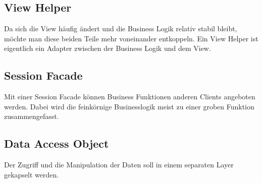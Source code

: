 \subsection{View Helper}

Da sich die View häufig ändert und die Business Logik relativ stabil bleibt, möchte man diese beiden Teile mehr voneinander entkoppeln. Ein View Helper ist eigentlich ein Adapter zwischen der Business Logik und dem View.

\subsection{Session Facade}

Mit einer Session Facade können Business Funktionen anderen Clients angeboten werden. Dabei wird die feinkörnige Businesslogik meist zu einer groben Funktion zusammengefasst.

\subsection{Data Access Object}

Der Zugriff und die Manipulation der Daten soll in einem separaten Layer gekapselt werden. 